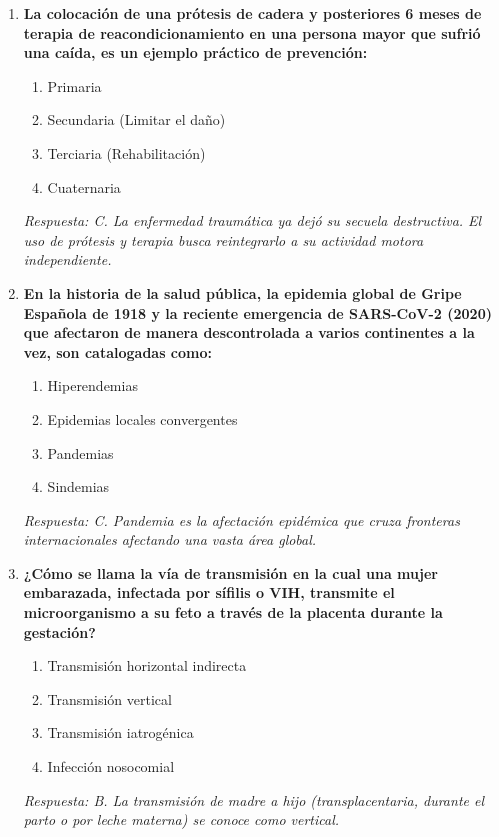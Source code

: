 \documentclass[spanish,letterpaper,oneside]{article}
\begin{document}
\begin{enumerate}[label=\textbf{\arabic*.}]
    \item \textbf{La colocación de una prótesis de cadera y posteriores 6 meses de terapia de reacondicionamiento en una persona mayor que sufrió una caída, es un ejemplo práctico de prevención:}
    \begin{enumerate}
        \item[A)] Primaria
        \item[B)] Secundaria (Limitar el daño)
        \item[C)] Terciaria (Rehabilitación)
        \item[D)] Cuaternaria
    \end{enumerate}
    \textit{Respuesta: C. La enfermedad traumática ya dejó su secuela destructiva. El uso de prótesis y terapia busca reintegrarlo a su actividad motora independiente.}

    \item \textbf{En la historia de la salud pública, la epidemia global de Gripe Española de 1918 y la reciente emergencia de SARS-CoV-2 (2020) que afectaron de manera descontrolada a varios continentes a la vez, son catalogadas como:}
    \begin{enumerate}
        \item[A)] Hiperendemias
        \item[B)] Epidemias locales convergentes
        \item[C)] Pandemias
        \item[D)] Sindemias
    \end{enumerate}
    \textit{Respuesta: C. Pandemia es la afectación epidémica que cruza fronteras internacionales afectando una vasta área global.}

    \item \textbf{¿Cómo se llama la vía de transmisión en la cual una mujer embarazada, infectada por sífilis o VIH, transmite el microorganismo a su feto a través de la placenta durante la gestación?}
    \begin{enumerate}
        \item[A)] Transmisión horizontal indirecta
        \item[B)] Transmisión vertical
        \item[C)] Transmisión iatrogénica
        \item[D)] Infección nosocomial
    \end{enumerate}
    \textit{Respuesta: B. La transmisión de madre a hijo (transplacentaria, durante el parto o por leche materna) se conoce como vertical.}


\end{enumerate}
\end{document}
